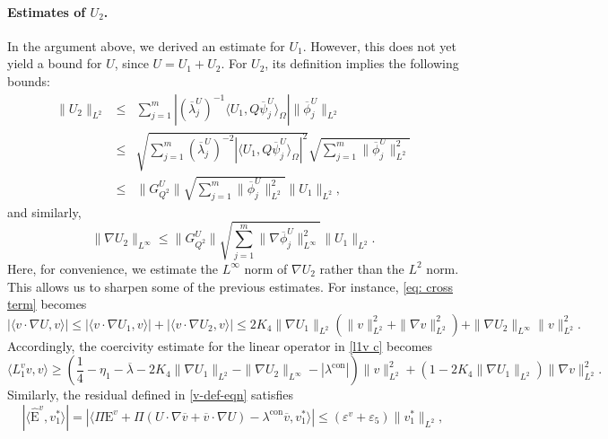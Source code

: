 \documentclass[11pt,a4paper]{article}
\numberwithin{equation}{section}
\newcommand{\Epsilon}{\mathrm{E}}
\newcommand{\cdummy}{\cdot}
\newcommand{\tmop}[1]{\ensuremath{\operatorname{#1}}}
\begin{document}
\paragraph{Estimates of $U_2$.} \label{rmk: U2}
  In the argument above, we derived an estimate for $U_1$. However, this does
  not yet yield a bound for $U$, since $U = U_1 + U_2$. For $U_2$, its
  definition implies the following bounds:
  \begin{eqnarray}
    \| U_2 \|_{L^2} & \leqslant & \sum_{j = 1}^m | (\overline{\lambda}_j^U)^{- 1}
    \langle U_1, Q \overline{\psi}_j^U \rangle_{\Omega} | \|
    \overline{\phi}_j^U \|_{L^2}\nonumber\\
    & \leqslant & \sqrt{\sum_{j = 1}^m (\overline{\lambda}_j^U)^{- 2} | \langle
    U_1, Q \overline{\psi}_j^U \rangle_{\Omega} |^2} \sqrt{\sum_{j = 1}^m \|
    \overline{\phi}_j^U \|_{L^2}^2}\nonumber\\
    & \leqslant & \| G_{Q^2}^U \| \sqrt{\sum_{j = 1}^m \|
    \overline{\phi}_j^U \|_{L^2}^2}\| U_1 \|_{L^2},\label{u2l2111}
  \end{eqnarray}
  and similarly,
  \begin{equation}
      \| \nabla U_2 \|_{L^{\infty}} \leqslant \| G_{Q^2}^U \|\sqrt{\sum_{j =
     1}^m \| \nabla \overline{\phi}_j^U \|_{L^{\infty}}^2}\| U_1 \|_{L^2} . \label{u2h1}
  \end{equation} 
  Here, for convenience, we estimate the $L^{\infty}$ norm of $\nabla U_2$
  rather than the $L^2$ norm. This allows us to sharpen some of the previous
  estimates. For instance, \eqref{eq: cross term} becomes
  \[ | \langle v \cdummy \nabla U, v \rangle | \leqslant | \langle v \cdummy
     \nabla U_1, v \rangle | + | \langle v \cdummy \nabla U_2, v \rangle |
     \leqslant 2 K_4 \| \nabla U_1 \|_{L^2} (\| v \|_{L^2}^2 + \| \nabla v
     \|_{L^2}^2) + \| \nabla U_2 \|_{L^{\infty}} \| v \|_{L^2}^2 . \]
  Accordingly, the coercivity estimate for the linear operator in \eqref{l1v c} becomes
  \begin{equation}
    \langle L_1^v v, v \rangle \geqslant \left( \frac{1}{4} - \eta_1 -
    \overline{\lambda} - 2 K_4 \| \nabla U_1 \|_{L^2} - \| \nabla U_2
    \|_{L^{\infty}} - | \lambda^{\tmop{con}} | \right) \| v \|_{L^2}^2 + (1 -
    2 K_4 \| \nabla U_1 \|_{L^2}) \| \nabla v \|_{L^2}^2 . \label{eq:new coercivity v}
  \end{equation}
  Similarly, the residual defined in \eqref{v-def-eqn} satisfies
  \begin{equation}
      | \langle \hat{\Epsilon}^v, v_1^{\ast} \rangle | =|\langle  \Pi\Epsilon^v + \Pi (U \cdot \nabla \overline{v} +
  \overline{v} \cdot \nabla U) - \lambda^\text{con} \overline{v}, v_1^{\ast} \rangle |\leqslant (\varepsilon^v
     + \varepsilon_5) \|v_1^{\ast} \|_{L^2},\label{eq: res est v}
  \end{equation}
\end{document}
